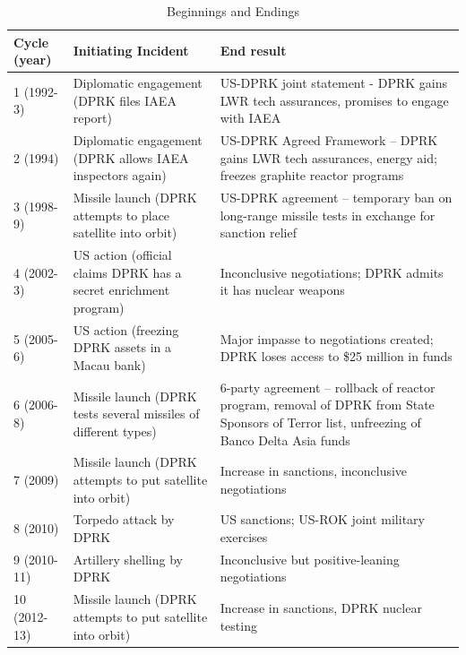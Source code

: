 \documentclass{article}
\begin{document}
\begin{table}[H]
	\caption{Beginnings and Endings}
	\begin{tabular}{|l|p{5cm}|p{5cm}|}
	\hline
	Cycle (year) & Initiating Incident & End result \\ 
	\hline
	1 (1992-3) & Diplomatic engagement (DPRK files IAEA report) & US-DPRK joint statement - DPRK gains LWR tech assurances, promises to engage with IAEA \\ 
	\hline
	2 (1994) & Diplomatic engagement (DPRK allows IAEA inspectors again) & US-DPRK Agreed Framework – DPRK gains LWR tech assurances, energy aid; freezes graphite reactor programs \\ 
	\hline
	3 (1998-9) & Missile launch (DPRK attempts to place satellite into orbit) & US-DPRK agreement – temporary ban on long-range missile tests in exchange for sanction relief \\ 
	\hline
	4 (2002-3) & US action (official claims DPRK has a secret enrichment program) & Inconclusive negotiations; DPRK admits it has nuclear weapons \\ 
	\hline
	5 (2005-6) & US action (freezing DPRK assets in a Macau bank) & Major impasse to negotiations created; DPRK loses access to \$25 million in funds \\ 
	\hline
	6 (2006-8) & Missile launch (DPRK tests several missiles of different types) & 6-party agreement – rollback of reactor program, removal of DPRK from State Sponsors of Terror list, unfreezing of Banco Delta Asia funds \\ 
	\hline
	7 (2009) & Missile launch (DPRK attempts to put satellite into orbit) & Increase in sanctions, inconclusive negotiations \\ 
	\hline
	8 (2010) & Torpedo attack by DPRK & US sanctions; US-ROK joint military exercises \\ 
	\hline
	9 (2010-11) & Artillery shelling by DPRK & Inconclusive but positive-leaning negotiations \\ 
	\hline
	10 (2012-13) & Missile launch (DPRK attempts to put satellite into orbit) & Increase in sanctions, DPRK nuclear testing \\
	\hline
	\end{tabular}
\end{table}
\end{document}
